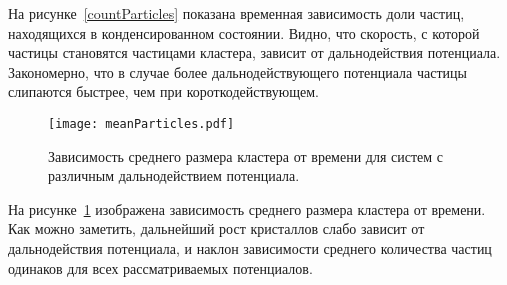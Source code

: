 На рисунке~\ref{countParticles} показана временная зависимость доли частиц, находящихся в конденсированном состоянии. Видно, что скорость, с которой частицы становятся частицами кластера, зависит от дальнодействия потенциала. Закономерно, что в случае более дальнодействующего потенциала частицы слипаются быстрее, чем при короткодействующем.

\begin{figure}[!t]
    \centering
    \texttt{[image: meanParticles.pdf]}
    \caption{Зависимость среднего размера кластера от времени для систем с различным дальнодействием потенциала.}
    \label{meanParticles}
\end{figure}

На рисунке~\ref{meanParticles} изображена зависимость среднего размера кластера от времени. Как можно заметить, дальнейший рост кристаллов слабо зависит от дальнодействия потенциала, и наклон зависимости среднего количества частиц одинаков для всех рассматриваемых потенциалов.


